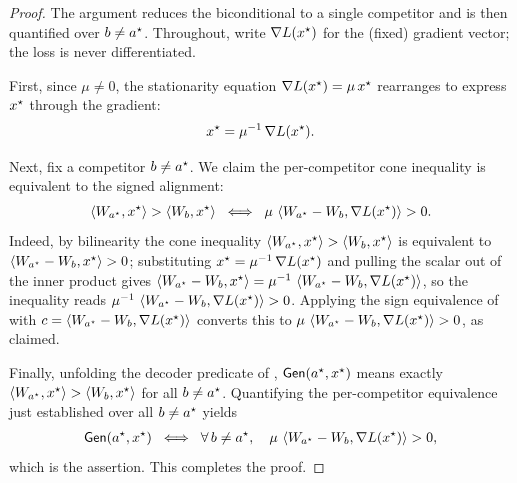 \begin{proof}
The argument reduces the biconditional to a single competitor and is then quantified over
$b \ne a^{\star}$. Throughout, write $\nabla L(x^{\star})$ for the (fixed) gradient vector; the
loss is never differentiated.

First, since $\mu \ne 0$, the stationarity equation $\nabla L(x^{\star}) = \mu\,x^{\star}$
rearranges to express $x^{\star}$ through the gradient:
\begin{align*}
x^{\star} = \mu^{-1}\,\nabla L(x^{\star}).
\end{align*}

Next, fix a competitor $b \ne a^{\star}$. We claim the per-competitor cone inequality is
equivalent to the signed alignment:
\begin{align*}
\left\langle W_{a^{\star}}, x^{\star} \right\rangle > \left\langle W_{b}, x^{\star} \right\rangle
\;\iff\;
\mu\,\left\langle W_{a^{\star}} - W_{b}, \nabla L(x^{\star}) \right\rangle > 0.
\end{align*}
Indeed, by bilinearity the cone inequality $\left\langle W_{a^{\star}}, x^{\star} \right\rangle > \left\langle W_{b}, x^{\star} \right\rangle$
is equivalent to $\left\langle W_{a^{\star}} - W_{b}, x^{\star} \right\rangle > 0$; substituting
$x^{\star} = \mu^{-1}\,\nabla L(x^{\star})$ and pulling the scalar out of the inner product gives
$\left\langle W_{a^{\star}} - W_{b}, x^{\star} \right\rangle = \mu^{-1}\,\left\langle W_{a^{\star}} - W_{b}, \nabla L(x^{\star}) \right\rangle$,
so the inequality reads $\mu^{-1}\,\left\langle W_{a^{\star}} - W_{b}, \nabla L(x^{\star}) \right\rangle > 0$.
Applying the sign equivalence of  with
$c = \left\langle W_{a^{\star}} - W_{b}, \nabla L(x^{\star}) \right\rangle$ converts this to %
$\mu\,\left\langle W_{a^{\star}} - W_{b}, \nabla L(x^{\star}) \right\rangle > 0$, as claimed.

Finally, unfolding the decoder predicate of ,
$\mathsf{Gen}(a^{\star}, x^{\star})$ means exactly $\left\langle W_{a^{\star}}, x^{\star} \right\rangle > \left\langle W_{b}, x^{\star} \right\rangle$
for all $b \ne a^{\star}$. Quantifying the per-competitor equivalence just established over all
$b \ne a^{\star}$ yields
\begin{align*}
\mathsf{Gen}(a^{\star}, x^{\star})
\;\iff\;
\forall\, b \ne a^{\star},\quad \mu\,\left\langle W_{a^{\star}} - W_{b}, \nabla L(x^{\star}) \right\rangle > 0,
\end{align*}
which is the assertion. This completes the proof.
\end{proof}

